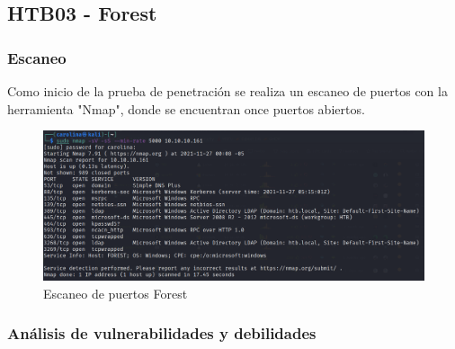\subsection{HTB03 - Forest}
    \subsubsection{Escaneo}
        \large{Como inicio de la prueba de penetración se realiza un escaneo de puertos con la herramienta "Nmap", donde se encuentran once puertos abiertos.}
        \par
        \begin{figure}[h!]
            \includegraphics[width=1\textwidth]{imagenes/nmap_forest.png} \par \vspace{0.1cm}
            \caption{Escaneo de puertos Forest} 
        \end{figure}
    \subsubsection{Análisis de vulnerabilidades y debilidades}
    